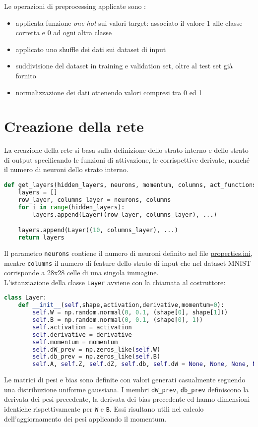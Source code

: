 Le operazioni di preprocessing applicate sono :
\begin{itemize}
    \item applicata funzione \textit{one hot} sui valori target: associato il valore 1 alle classe corretta e 0 ad ogni altra classe
    \item applicato uno shuffle dei dati sui dataset di input
    \item suddivisione del dataset in training e validation set, oltre al test set già fornito
    \item normalizzazione dei dati ottenendo valori compresi tra 0 ed 1
\end{itemize}

\section{Creazione della rete}
La creazione della rete si basa sulla definizione dello strato interno e dello strato di output specificando le funzioni di attivazione, le corrispettive derivate, nonché il numero di neuroni dello strato interno.
\begin{lstlisting}[language=Python]
def get_layers(hidden_layers, neurons, momentum, columns, act_functions):
    layers = []
    row_layer, columns_layer = neurons, columns
    for i in range(hidden_layers):
        layers.append(Layer((row_layer, columns_layer), ...)

    layers.append(Layer((10, columns_layer), ...)
    return layers
\end{lstlisting}
Il parametro \texttt{neurons} contiene il numero di neuroni definito nel file \underline{properties.ini}, mentre \texttt{columns} il numero di feature dello strato di input che nel dataset MNIST corrisponde a 28x28 celle di una singola immagine. \\
L'istanziazione della classe \texttt{Layer} avviene con la chiamata al costruttore:
\begin{lstlisting}[language=Python]
class Layer:
    def __init__(self,shape,activation,derivative,momentum=0):
        self.W = np.random.normal(0, 0.1, (shape[0], shape[1]))
        self.B = np.random.normal(0, 0.1, (shape[0], 1))
        self.activation = activation
        self.derivative = derivative
        self.momentum = momentum
        self.dW_prev = np.zeros_like(self.W)
        self.db_prev = np.zeros_like(self.B)
        self.A, self.Z, self.dZ, self.db, self.dW = None, None, None, None, None
\end{lstlisting}
Le matrici di pesi e bias sono definite con valori generati casualmente seguendo una distribuzione uniforme gaussiana. I membri \texttt{dW\_prev}, \texttt{db\_prev} definiscono la derivata dei pesi precedente, la derivata dei bias precedente ed hanno dimensioni identiche rispettivamente per \texttt{W} e \texttt{B}. Essi risultano utili nel calcolo dell'aggiornamento dei pesi applicando il momentum. \\


